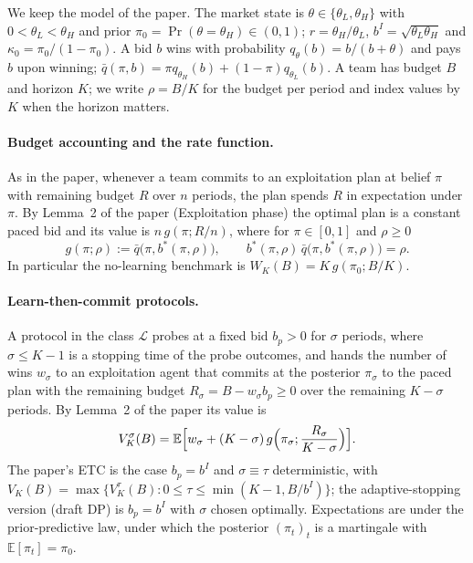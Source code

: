 \documentclass[11pt]{article}
\theoremstyle{definition}
\theoremstyle{remark}
\newcommand{\E}{\mathbb{E}}
\newcommand{\qbar}{\bar q}
\newcommand{\cL}{\mathcal{L}}
\begin{document}
We keep the model of the paper. The market state is $\theta\in\{\theta_L,\theta_H\}$ with $0<\theta_L<\theta_H$
and prior $\pi_0=\Pr(\theta=\theta_H)\in(0,1)$; $r=\theta_H/\theta_L$, $b^I=\sqrt{\theta_L\theta_H}$ and
$\kappa_0=\pi_0/(1-\pi_0)$. A bid $b$ wins with probability $q_\theta(b)=b/(b+\theta)$ and pays $b$ upon winning;
$\qbar(\pi,b)=\pi q_{\theta_H}(b)+(1-\pi)q_{\theta_L}(b)$. A team has budget $B$ and horizon $K$; we write
$\rho=B/K$ for the budget per period and index values by $K$ when the horizon matters.

\paragraph{Budget accounting and the rate function.} As in the paper, whenever a team commits to an
exploitation plan at belief $\pi$ with remaining budget $R$ over $n$ periods, the plan spends $R$ in
expectation under $\pi$. By Lemma~2 of the paper (Exploitation phase) the optimal plan is a constant paced bid and
its value is $n\,g(\pi;R/n)$, where for $\pi\in[0,1]$ and $\rho\ge0$
\begin{equation}\label{eq:g}
g(\pi;\rho):=\qbar\bigl(\pi,b^*(\pi,\rho)\bigr),\qquad b^*(\pi,\rho)\,\qbar\bigl(\pi,b^*(\pi,\rho)\bigr)=\rho .
\end{equation}
In particular the no-learning benchmark is $W_K(B)=K\,g(\pi_0;B/K)$.

\paragraph{Learn-then-commit protocols.} A protocol in the class $\cL$ probes at a fixed bid $b_p>0$ for $\sigma$
periods, where $\sigma\le K-1$ is a stopping time of the probe outcomes, and hands the number of wins
$w_\sigma$ to an exploitation agent that commits at the posterior $\pi_\sigma$ to the paced plan with the remaining
budget $R_\sigma=B-w_\sigma b_p\ge0$ over the remaining $K-\sigma$ periods. By Lemma~2 of the paper its value is
\begin{equation}\label{eq:VL}
V_K^{\sigma}(B)=\E\Bigl[w_\sigma+(K-\sigma)\,g\Bigl(\pi_\sigma;\frac{R_\sigma}{K-\sigma}\Bigr)\Bigr].
\end{equation}
The paper's ETC is the case $b_p=b^I$ and $\sigma\equiv\tau$ deterministic, with
$V_K(B)=\max\{V_K^{\tau}(B):0\le\tau\le\min(K-1,B/b^I)\}$; the adaptive-stopping version (draft DP) is $b_p=b^I$
with $\sigma$ chosen optimally. Expectations are under the prior-predictive law, under which the posterior
$(\pi_t)_t$ is a martingale with $\E[\pi_t]=\pi_0$.
\end{document}
